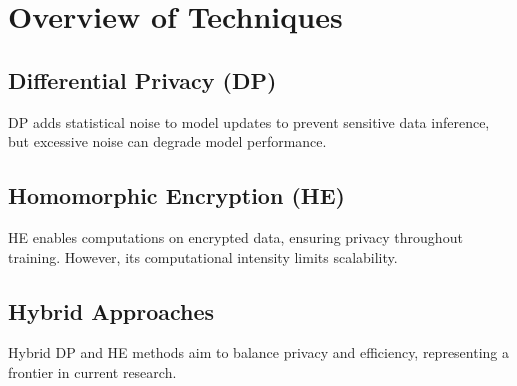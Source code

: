 \documentclass[12pt]{report}
\begin{document}
\section{Overview of Techniques}

\subsection{Differential Privacy (DP)}
DP adds statistical noise to model updates to prevent sensitive data inference, but excessive noise can degrade model performance.

\subsection{Homomorphic Encryption (HE)}
HE enables computations on encrypted data, ensuring privacy throughout training. However, its computational intensity limits scalability.

\subsection{Hybrid Approaches}
Hybrid DP and HE methods aim to balance privacy and efficiency, representing a frontier in current research.
\end{document}

